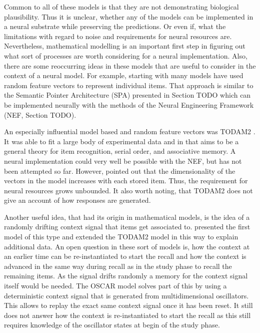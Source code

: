 Common to all of these models is that they are not demonstrating biological plausibility.
Thus it is unclear, whether any of the models can be implemented in a neural substrate while preserving the predictions.
Or even if, what the limitations with regard to noise and requirements for neural resources are.
Nevertheless, mathematical modelling is an important first step in figuring out what sort of processes are worth considering for a neural implementation.
Also, there are some reoccurring ideas in these models that are useful to consider in the context of a neural model.
For example, starting with \textcite{Anderson1973} many models have used random feature vectors to represent individual items.
That approach is similar to the Semantic Pointer Architecture (SPA) presented in Section TODO which can be implemented neurally with the methods of the Neural Engineering Framework (NEF, Section TODO).

An especially influential model based and random feature vectors was TODAM2 \parencite{Murdock1993}.
It was able to fit a large body of experimental data and in that aims to be a general theory for item recognition, serial order, and associative memory.
A neural implementation could very well be possible with the NEF, but has not been attempted so far.
However, \textcite{Choo2010} pointed out that the dimensionality of the vectors in the model increases with each stored item.
Thus, the requirement for neural resources grows unbounded.
It also worth noting, that TODAM2 does not give an account of how responses are generated.

Another useful idea, that had its origin in mathematical models, is the idea of a randomly drifting context signal that items get associated to.
\Textcite{Estes1955} presented the first model of this type and \textcite{Murdock1997} extended the TODAM2 model in this way to explain additional data.
An open question in these sort of models is, how the context at an earlier time can be re-instantiated to start the recall and how the context is advanced in the same way during recall as in the study phase to recall the remaining items.
As the signal drifts randomly a memory for the context signal itself would be needed.
The OSCAR model \parencite{Brown2000} solves part of this by using a deterministic context signal that is generated from multidimensional oscillators.
This allows to replay the exact same context signal once it has been reset.
It still does not answer how the context is re-instantiated to start the recall as this still requires knowledge of the oscillator states at begin of the study phase.

